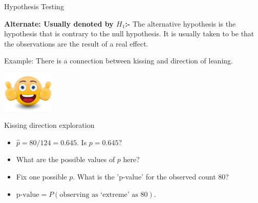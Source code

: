 \documentclass{beamer}\usepackage[]{graphicx}\usepackage[]{color}
\begin{document}
\begin{frame}{Hypothesis Testing}

{\bf Alternate: Usually denoted by $H_1$:-} The alternative hypothesis is the hypothesis  that is contrary to the null hypothesis. It is usually taken to be that the observations are the result of a real effect. \pause \newline

Example: There is a connection between kissing and direction of leaning. \pause

\begin{center}
\includegraphics[width=2.5cm,height=2.3 cm]{optimistic.png}
\end{center}

\end{frame}

\begin{frame}{Kissing direction exploration}

\begin{itemize}
\item $\hat{p}= 80/124 = 0.645$. Is $p= 0.645?$ \pause
\item What are the possible values of $p$ here? \pause 
\item Fix one possible $p$. What is the 'p-value' for the observed count 80? \pause 
\item $\text{p-value} = P ( \text{observing as `extreme' as }80 )$.\pause
\end{itemize}

\end{frame}
\end{document}
